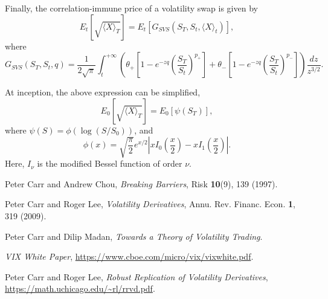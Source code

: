 \documentclass[12pt]{article}
\begin{document}
      Finally, the correlation-immune price of a volatility swap is given by
      \begin{equation}
        E_t\left[\sqrt{\langle X \rangle_T}\right] = E_t\left[G_{SVS}\left(S_T,S_t,\langle X \rangle_t\right)\right],
      \end{equation}
      where
      \begin{equation}
        G_{SVS}\left(S_T,S_t,q\right) = \frac{1}{2\sqrt{\pi}}\int_t^{+\infty}\left(\theta_+\left[1-e^{-zq}\left(\frac{S_T}{S_t}\right)^{p_+}\right]
                                                                                + \theta_-\left[1-e^{-zq}\left(\frac{S_T}{S_t}\right)^{p_-}\right]\right)\frac{dz}{z^{3/2}}.
      \end{equation}

      At inception, the above expression can be simplified,
      \begin{equation}
        E_0\left[\sqrt{\langle X \rangle_T}\right] = E_0\left[\psi(S_T)\right],
      \end{equation}
      where $\psi(S)=\phi(\log(S/S_0))$, and
      \begin{equation}
        \phi(x)=\sqrt{\frac{\pi}{2}}e^{x/2}\left|xI_0\left(\frac{x}{2}\right)-xI_1\left(\frac{x}{2}\right)\right|.
      \end{equation}
      Here, $I_{\nu}$ is the modified Bessel function of order $\nu$.


\begin{thebibliography}{99}
    Peter Carr and Andrew Chou, {\it Breaking Barriers}, Risk {\bf 10}(9), 139 (1997).

    Peter Carr and Roger Lee, {\it Volatility Derivatives}, Annu. Rev. Financ. Econ. {\bf 1}, 319 (2009).

    Peter Carr and Dilip Madan, {\it Towards a Theory of Volatility Trading}.

    {\it VIX White Paper}, \url{https://www.cboe.com/micro/vix/vixwhite.pdf}.

    Peter Carr and Roger Lee, {\it Robust Replication of Volatility Derivatives}, \url{https://math.uchicago.edu/~rl/rrvd.pdf}.

\end{thebibliography}
\end{document}
